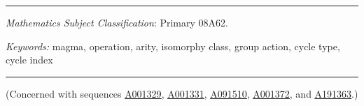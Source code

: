 \documentclass[12pt]{article}
\newcommand{\seqnum}[1]{\href{https://oeis.org/#1}{\rm \underline{#1}}}
\theoremstyle{definition}
\theoremstyle{remark}
\begin{document}
	\bigskip
	\hrule
	\bigskip

	 {\it Mathematics Subject Classification}: Primary 08A62.

	\noindent \emph{Keywords:} magma, operation, arity, isomorphy class, group action, cycle type, cycle index

	\bigskip
	\hrule
	\bigskip

	\noindent (Concerned with sequences
	\seqnum{A001329},
	\seqnum{A001331},
	\seqnum{A091510},
	\seqnum{A001372}, and
	\seqnum{A191363}.)
\end{document}
